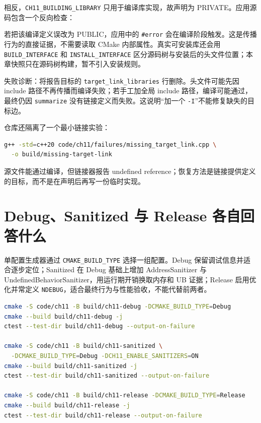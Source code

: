 相反，\texttt{CH11\_BUILDING\_LIBRARY} 只用于编译库实现，故声明为 PRIVATE。应用源码包含一个反向检查：



若把该编译定义误改为 PUBLIC，应用中的 \texttt{\#error} 会在编译阶段触发。这是传播行为的直接证据，不需要读取 CMake 内部属性。真实可安装库还会用 \texttt{BUILD\_INTERFACE} 和 \texttt{INSTALL\_INTERFACE} 区分源码树与安装后的头文件位置；本章快照只在源码树构建，暂不引入安装规则。

失败诊断：将报告目标的 \texttt{target\_link\_libraries} 行删除。头文件可能先因 include 路径不再传播而编译失败；若手工加全局 include 路径，编译可能通过，最终仍因 \texttt{summarize} 没有链接定义而失败。这说明“加一个 \texttt{-I}”不能修复缺失的目标边。

仓库还隔离了一个最小链接实验：



\begin{lstlisting}[language=bash,numbers=none]
g++ -std=c++20 code/ch11/failures/missing_target_link.cpp \
  -o build/missing-target-link
\end{lstlisting}

源文件能通过编译，但链接器报告 undefined reference；恢复方法是链接提供定义的目标，而不是在声明后再写一份临时实现。

\section{Debug、Sanitized 与 Release 各自回答什么}

单配置生成器通过 \texttt{CMAKE\_BUILD\_TYPE} 选择一组配置。Debug 保留调试信息并适合逐步定位；Sanitized 在 Debug 基础上增加 AddressSanitizer 与 UndefinedBehaviorSanitizer，用运行期开销换取内存和 UB 证据；Release 启用优化并常定义 \texttt{NDEBUG}，适合最终行为与性能验收，不能代替前两者。

\begin{lstlisting}[language=bash,numbers=none]
cmake -S code/ch11 -B build/ch11-debug -DCMAKE_BUILD_TYPE=Debug
cmake --build build/ch11-debug -j
ctest --test-dir build/ch11-debug --output-on-failure

cmake -S code/ch11 -B build/ch11-sanitized \
  -DCMAKE_BUILD_TYPE=Debug -DCH11_ENABLE_SANITIZERS=ON
cmake --build build/ch11-sanitized -j
ctest --test-dir build/ch11-sanitized --output-on-failure

cmake -S code/ch11 -B build/ch11-release -DCMAKE_BUILD_TYPE=Release
cmake --build build/ch11-release -j
ctest --test-dir build/ch11-release --output-on-failure
\end{lstlisting}

